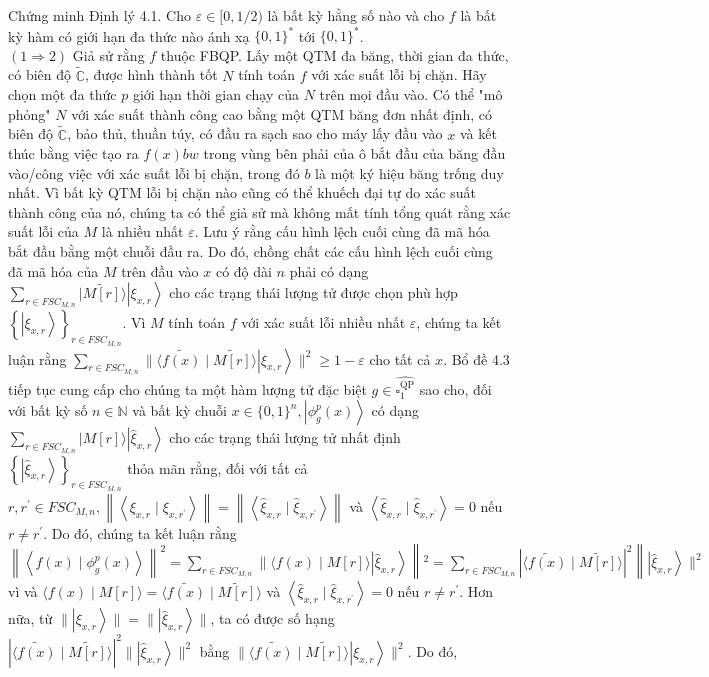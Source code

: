 \documentclass[10pt]{article}
\begin{document}
Chứng minh Định lý 4.1. Cho $\varepsilon \in[0,1 / 2)$ là bất kỳ hằng số nào và cho $f$ là bất kỳ hàm có giới hạn đa thức nào ánh xạ $\{0,1\}^{*}$ tới $\{0,1\}^{*}$.\\
$(1 \Rightarrow 2)$ Giả sử rằng $f$ thuộc FBQP. Lấy một QTM đa băng, thời gian đa thức, có biên độ $\tilde{\mathbb{C}}$, được hình thành tốt $N$ tính toán $f$ với xác suất lỗi bị chặn. Hãy chọn một đa thức $p$ giới hạn thời gian chạy của $N$ trên mọi đầu vào. Có thể "mô phỏng" $N$ với xác suất thành công cao bằng một QTM băng đơn nhất định, có biên độ $\tilde{\mathbb{C}}$, bảo thủ, thuần túy, có đầu ra sạch sao cho máy lấy đầu vào $x$ và kết thúc bằng việc tạo ra $f(x) b w$ trong vùng bên phải của ô bắt đầu của băng đầu vào/công việc với xác suất lỗi bị chặn, trong đó $b$ là một ký hiệu băng trống duy nhất. Vì bất kỳ QTM lỗi bị chặn nào cũng có thể khuếch đại tự do xác suất thành công của nó, chúng ta có thể giả sử mà không mất tính tổng quát rằng xác suất lỗi của $M$ là nhiều nhất $\varepsilon$. Lưu ý rằng cấu hình lệch cuối cùng đã mã hóa bắt đầu bằng một chuỗi đầu ra. Do đó, chồng chất các cấu hình lệch cuối cùng đã mã hóa của $M$ trên đầu vào $x$ có độ dài $n$ phải có dạng $\sum_{r \in F S C_{M, n}}|\widetilde{M[r]}\rangle\left|\xi_{x, r}\right\rangle$ cho các trạng thái lượng tử được chọn phù hợp $\left\{\left|\xi_{x, r}\right\rangle\right\}_{r \in F S C_{M, n}}$. Vì $M$ tính toán $f$ với xác suất lỗi nhiều nhất $\varepsilon$, chúng ta kết luận rằng $\sum_{r \in F S C_{M, n}} \|\langle\widetilde{f(x)} \mid \widetilde{M[r]}\rangle\left|\xi_{x, r}\right\rangle \|^{2} \geq 1-\varepsilon$ cho tất cả $x$. Bổ đề 4.3 tiếp tục cung cấp cho chúng ta một hàm lượng tử đặc biệt $g \in \widehat{\square_{1}^{\mathrm{QP}}}$ sao cho, đối với bất kỳ số $n \in \mathbb{N}$ và bất kỳ chuỗi $x \in\{0,1\}^{n},\left|\phi_{g}^{p}(x)\right\rangle$ có dạng $\sum_{r \in F S C_{M, n}}|M[r]\rangle\left|\widehat{\xi}_{x, r}\right\rangle$ cho các trạng thái lượng tử nhất định $\left\{\left|\widehat{\xi}_{x, r}\right\rangle\right\}_{r \in F S C_{M, n}}$ thỏa mãn rằng, đối với tất cả $r, r^{\prime} \in F S C_{M, n},\left\|\left\langle\xi_{x, r} \mid \xi_{x, r^{\prime}}\right\rangle\right\|=\left\|\left\langle\widehat{\xi}_{x, r} \mid \widehat{\xi}_{x, r^{\prime}}\right\rangle\right\|$ và $\left\langle\widehat{\xi}_{x, r} \mid \widehat{\xi}_{x, r^{\prime}}\right\rangle=0$ nếu $r \neq r^{\prime}$. Do đó, chúng ta kết luận rằng $\left\|\left\langle f(x) \mid \phi_{g}^{p}(x)\right\rangle\right\|^{2}=\sum_{r \in F S C_{M, n}} \|\langle f(x) \mid M[r]\rangle\left|\widehat{\xi}_{x, r}\right\rangle\left\|^{2}=\sum_{r \in F S C_{M, n}}|\langle\widetilde{f(x)} \mid \widetilde{M[r]}\rangle|^{2}\right\|\left|\widehat{\xi}_{x, r}\right\rangle \|^{2}$ vì và $\langle f(x) \mid M[r]\rangle=\langle\widetilde{f(x)} \mid \widetilde{M[r]}\rangle$ và $\left\langle\widehat{\xi}_{x, r} \mid \widehat{\xi}_{x, r^{\prime}}\right\rangle=0$ nếu $r \neq r^{\prime}$. Hơn nữa, từ $\|\left|\xi_{x, r}\right\rangle\|=\|\left|\widehat{\xi}_{x, r}\right\rangle \|$, ta có được số hạng $|\langle\widetilde{f(x)} \mid \widetilde{M[r]}\rangle|^{2} \|\left|\widehat{\xi}_{x, r}\right\rangle \|^{2}$ bằng $\|\langle\widetilde{f(x)} \mid \widetilde{M[r]}\rangle\left|\xi_{x, r}\right\rangle \|^{2}$. Do đó, 
\end{document}
